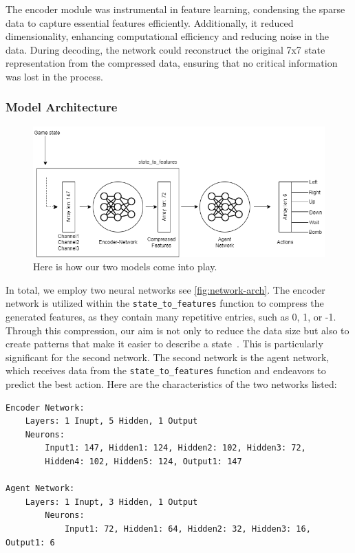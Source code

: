 The encoder module was instrumental in feature learning, condensing the sparse data to capture essential features efficiently. 
Additionally, it reduced dimensionality, enhancing computational efficiency and reducing noise in the data. During decoding, the network could 
reconstruct the original 7x7 state representation from the compressed data, ensuring that no critical information was lost in the process.

\subsubsection{Model Architecture}

\begin{figure}[H]
    \centering
    
    \includegraphics[width=\oneImgWidth]{images/network-arch}%
    
    \captionadjust%
    \caption{\label{fig:network-arch} Here is how our two models come into play.
    }%
\end{figure}

In total, we employ two neural networks see \autoref{fig:network-arch}. The encoder network is utilized within the \verb|state_to_features| function to compress the 
generated features, as they contain many repetitive entries, such as 0, 1, or -1. Through this compression, our aim is not only to reduce 
the data size but also to create patterns that make it easier to describe a state~\cite{Onl:autoencoder}. This is particularly significant for the second network. 
The second network is the agent network, which receives data from the \verb|state_to_features| function and endeavors to predict the best action.
Here are the characteristics of the two networks listed:

\begin{verbatim}
Encoder Network:
    Layers: 1 Inupt, 5 Hidden, 1 Output
    Neurons: 
        Input1: 147, Hidden1: 124, Hidden2: 102, Hidden3: 72,
        Hidden4: 102, Hidden5: 124, Output1: 147

Agent Network:
    Layers: 1 Inupt, 3 Hidden, 1 Output
        Neurons: 
            Input1: 72, Hidden1: 64, Hidden2: 32, Hidden3: 16, Output1: 6
\end{verbatim}

